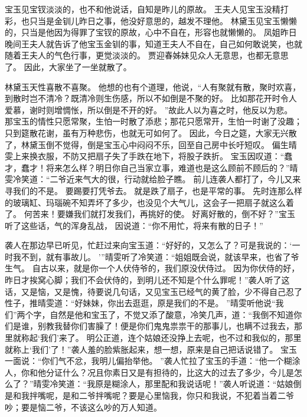 宝玉见宝钗淡淡的，也不和他说话，自知是昨儿的原故。
王夫人见宝玉没精打彩，也只当是金钏儿昨日之事，他没好意思的，越发不理他。
林黛玉见宝玉懒懒的，只当是他因为得罪了宝钗的原故，心中不自在，形容也就懒懒的。
凤姐昨日晚间王夫人就告诉了他宝玉金钏的事，知道王夫人不自在，自己如何敢说笑，也就随着王夫人的气色行事，更觉淡淡的。
贾迎春姊妹见众人无意思，也都无意思了。
因此，大家坐了一坐就散了。
\par
林黛玉天性喜散不喜聚。
他想的也有个道理，他说，“人有聚就有散，聚时欢喜，到散时岂不清冷？既清冷则生伤感，所以不如倒是不聚的好。
比如那花开时令人爱慕，谢时则增惆怅，所以倒是不开的好。
”故此人以为喜之时，他反以为悲。
那宝玉的情性只愿常聚，生怕一时散了添悲；那花只愿常开，生怕一时谢了没趣；只到筵散花谢，虽有万种悲伤，也就无可如何了。
因此，今日之筵，大家无兴散了，林黛玉倒不觉得，倒是宝玉心中闷闷不乐，回至自己房中长吁短叹。
偏生晴雯上来换衣服，不防又把扇子失了手跌在地下，将股子跌折。
宝玉因叹道：“蠢才，蠢才！将来怎么样？明日你自己当家立事，难道也是这么顾前不顾后的？”晴雯冷笑道：“二爷近来气大的很，行动就给脸子瞧。
前儿连袭人都打了，今儿又来寻我们的不是。
要踢要打凭爷去。
就是跌了扇子，也是平常的事。
先时连那么样的玻璃缸、玛瑙碗不知弄坏了多少，也没见个大气儿，这会子一把扇子就这么着了。
何苦来！要嫌我们就打发我们，再挑好的使。
好离好散的，倒不好？”宝玉听了这些话，气的浑身乱战，
因说道：“你不用忙，将来有散的日子！”\par
袭人在那边早已听见，忙赶过来向宝玉道：“好好的，又怎么了？可是我说的：‘一时我不到，就有事故儿。
’”晴雯听了冷笑道：“姐姐既会说，就该早来，也省了爷生气。
自古以来，就是你一个人伏侍爷的，我们原没伏侍过。
因为你伏侍的好，昨日才挨窝心脚；我们不会伏侍的，到明儿还不知是个什么罪呢！”袭人听了这话，又是恼，又是愧，待要说几句话，又见宝玉已经气的黄了脸，少不得自己忍了性子，推晴雯道：“好妹妹，你出去逛逛，原是我们的不是。
”晴雯听他说“我们”两个字，自然是他和宝玉了，不觉又添了酸意，冷笑几声，道：“我倒不知道你们是谁，别教我替你们害臊了！便是你们鬼鬼祟祟干的那事儿，也瞒不过我去，那里就称起‘我们’来了。
明公正道，连个姑娘还没挣上去呢，也不过和我似的，那里就称上‘我们’了！”袭人羞的脸紫胀起来，想一想，原来是自己把话说错了。
宝玉一面说：“你们气不忿，我明儿偏抬举他。
”袭人忙拉了宝玉的手道：“他一个糊涂人，你和他分证什么？况且你素日又是有担待的，比这大的过去了多少，今儿是怎么了？”晴雯冷笑道：“我原是糊涂人，那里配和我说话呢！”袭人听说道：“姑娘倒是和我拌嘴呢，是和二爷拌嘴呢？要是心里恼我，你只和我说，不犯着当着二爷吵；要是恼二爷，不该这么吵的万人知道。
